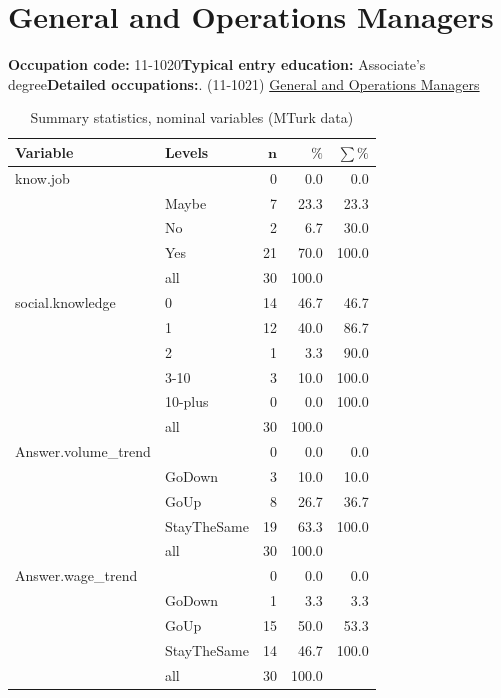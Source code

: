 \documentclass[a4paper,10pt]{article}\usepackage[]{graphicx}\usepackage[]{color}
\begin{document}
\newpage\section{General and Operations Managers}\textbf{Occupation code:} 11-1020\newline\textbf{Typical entry education:} Associate's degree\newline\textbf{Detailed occupations:}. (11-1021)  \href{http://www.bls.gov/oes/current/oes111021.htm}{General and Operations Managers}\newline%
\begin{table}[ht]
\centering
{\footnotesize
\begin{tabular}{ll|rrr}
 \textbf{Variable} & \textbf{Levels} & $\mathbf{n}$ & $\mathbf{\%}$ & $\mathbf{\sum \%}$ \\ 
  \hline
know.job &  & 0 & 0.0 & 0.0 \\ 
   & Maybe & 7 & 23.3 & 23.3 \\ 
   & No & 2 & 6.7 & 30.0 \\ 
   & Yes & 21 & 70.0 & 100.0 \\ 
   \hline
 & all & 30 & 100.0 &  \\ 
   \hline
\hline
social.knowledge & 0 & 14 & 46.7 & 46.7 \\ 
   & 1 & 12 & 40.0 & 86.7 \\ 
   & 2 & 1 & 3.3 & 90.0 \\ 
   & 3-10 & 3 & 10.0 & 100.0 \\ 
   & 10-plus & 0 & 0.0 & 100.0 \\ 
   \hline
 & all & 30 & 100.0 &  \\ 
   \hline
\hline
Answer.volume\_trend &  & 0 & 0.0 & 0.0 \\ 
   & GoDown & 3 & 10.0 & 10.0 \\ 
   & GoUp & 8 & 26.7 & 36.7 \\ 
   & StayTheSame & 19 & 63.3 & 100.0 \\ 
   \hline
 & all & 30 & 100.0 &  \\ 
   \hline
\hline
Answer.wage\_trend &  & 0 & 0.0 & 0.0 \\ 
   & GoDown & 1 & 3.3 & 3.3 \\ 
   & GoUp & 15 & 50.0 & 53.3 \\ 
   & StayTheSame & 14 & 46.7 & 100.0 \\ 
   \hline
 & all & 30 & 100.0 &  \\ 
   \hline
\hline
\end{tabular}
}
\caption{Summary statistics, nominal variables (MTurk data)} 
\label{tab1:11-1020}
\end{table}
\end{document}
